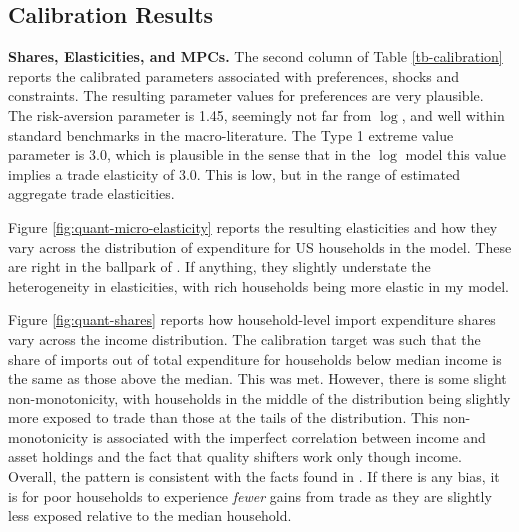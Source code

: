 \documentclass[12pt,pdftex]{article}
\begin{document}
\begin{onehalfspacing}
\subsection{Calibration Results}

\textbf{Shares, Elasticities, and MPCs.} The second column of Table \ref{tb-calibration} reports the calibrated parameters associated with preferences, shocks and constraints. The resulting parameter values for preferences are very plausible. The risk-aversion parameter is 1.45, seemingly not far from $\log$, and well within standard benchmarks in the macro-literature. The Type 1 extreme value parameter is 3.0, which is plausible in the sense that in the $\log$ model this value implies a trade elasticity of 3.0. This is low, but in the range of estimated aggregate trade elasticities.

Figure \ref{fig:quant-micro-elasticity} reports the resulting elasticities and how they vary across the distribution of expenditure for US households in the model. These are right in the ballpark of \citet{auer2022unequal}. If anything, they slightly understate the heterogeneity in elasticities, with rich households being more elastic in my model.

Figure \ref{fig:quant-shares} reports how household-level import expenditure shares vary across the income distribution. The calibration target was such that the share of imports out of total expenditure for households below median income is the same as those above the median. This was met. However, there is some slight non-monotonicity, with households in the middle of the distribution being slightly more exposed to trade than those at the tails of the distribution. This non-monotonicity is associated with the imperfect correlation between income and asset holdings and the fact that quality shifters work only though income. Overall, the pattern is consistent with the facts found in \citet{borusyak2021distributional}. If there is any bias, it is for poor households to experience \emph{fewer} gains from trade as they are slightly less exposed relative to the median household.


\end{onehalfspacing}
\end{document}
